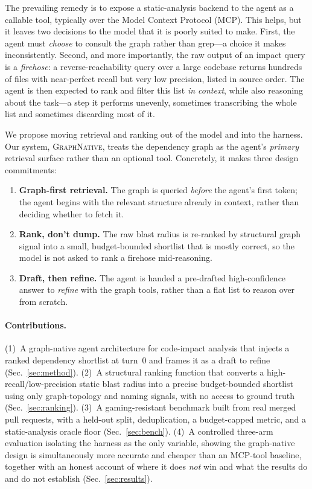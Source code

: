 \documentclass[11pt,twocolumn]{article}
\newcommand{\sys}{{\normalfont\scshape GraphNative}}
\begin{document}
The prevailing remedy is to expose a static-analysis backend to the agent as a callable
tool, typically over the Model Context Protocol (MCP). This helps, but it leaves two decisions
to the model that it is poorly suited to make. First, the agent must \emph{choose} to consult
the graph rather than grep---a choice it makes inconsistently. Second, and more importantly, the
raw output of an impact query is a \emph{firehose}: a reverse-reachability query over a large
codebase returns hundreds of files with near-perfect recall but very low precision, listed in
source order. The agent is then expected to rank and filter this list \emph{in context}, while
also reasoning about the task---a step it performs unevenly, sometimes transcribing the whole
list and sometimes discarding most of it.

We propose moving retrieval and ranking out of the model and into the harness. Our system,
\sys{}, treats the dependency graph as the agent's \emph{primary} retrieval surface rather than
an optional tool. Concretely, it makes three design commitments:

\begin{enumerate}[label=(C\arabic*)]
  \item \textbf{Graph-first retrieval.} The graph is queried \emph{before} the agent's first
  token; the agent begins with the relevant structure already in context, rather than deciding
  whether to fetch it.
  \item \textbf{Rank, don't dump.} The raw blast radius is re-ranked by structural graph signal
  into a small, budget-bounded shortlist that is mostly correct, so the model is not asked to
  rank a firehose mid-reasoning.
  \item \textbf{Draft, then refine.} The agent is handed a pre-drafted high-confidence answer to
  \emph{refine} with the graph tools, rather than a flat list to reason over from scratch.
\end{enumerate}

\paragraph{Contributions.}
(1)~A graph-native agent architecture for code-impact analysis that injects a ranked dependency
shortlist at turn~0 and frames it as a draft to refine (Sec.~\ref{sec:method}). (2)~A
structural ranking function that converts a high-recall/low-precision static blast radius into a
precise budget-bounded shortlist using only graph-topology and naming signals, with no access to
ground truth (Sec.~\ref{sec:ranking}). (3)~A gaming-resistant benchmark built from real merged
pull requests, with a held-out split, deduplication, a budget-capped metric, and a
static-analysis oracle floor (Sec.~\ref{sec:bench}). (4)~A controlled three-arm evaluation
isolating the harness as the only variable, showing the graph-native design is simultaneously
more accurate and cheaper than an MCP-tool baseline, together with an honest account of where it
does \emph{not} win and what the results do and do not establish (Sec.~\ref{sec:results}).
\end{document}
